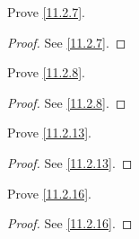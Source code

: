 \exercisesection

\begin{ex}\label{ex:11.2.1}
  Prove \cref{11.2.7}.
\end{ex}

\begin{proof}
  See \cref{11.2.7}.
\end{proof}

\begin{ex}\label{ex:11.2.2}
  Prove \cref{11.2.8}.
\end{ex}

\begin{proof}
  See \cref{11.2.8}.
\end{proof}

\begin{ex}\label{ex:11.2.3}
  Prove \cref{11.2.13}.
\end{ex}

\begin{proof}
  See \cref{11.2.13}.
\end{proof}

\begin{ex}\label{ex:11.2.4}
  Prove \cref{11.2.16}.
\end{ex}

\begin{proof}
  See \cref{11.2.16}.
\end{proof}
